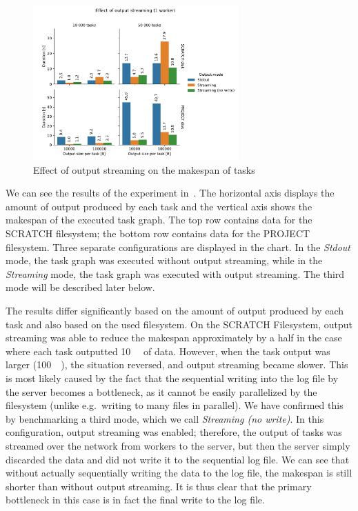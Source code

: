 \begin{figure}[h]
	\centering
	\includegraphics[width=0.7\textwidth]{imgs/hq/charts/io-streaming}
	\caption{Effect of output streaming on the makespan of tasks}
	\label{fig:hq-io-streaming}
\end{figure}

We can see the results of the experiment in~. The horizontal axis displays
the amount of output produced by each task and the vertical axis shows the makespan of the executed
task graph. The top row contains data for the SCRATCH filesystem; the bottom row contains data for
the PROJECT filesystem. Three separate configurations are displayed in the chart. In the
\emph{Stdout} mode, the task graph was executed without output streaming, while in the
\emph{Streaming} mode, the task graph was executed with output streaming. The third mode
will be described later below.

The results differ significantly based on the amount of output produced by each task and also based
on the used filesystem. On the SCRATCH Filesystem, output streaming was able to reduce the makespan
approximately by a half in the case where each task outputted \SI{10}{\kibi\byte} of data.
However, when the task output was larger (\SI{100}{\kibi\byte}), the situation reversed, and
output streaming became slower. This is most likely caused by the fact that the sequential writing
into the log file by the server becomes a bottleneck, as it cannot be easily parallelized by the
filesystem (unlike e.g.\ writing to many files in parallel). We have confirmed this by benchmarking
a third mode, which we call \emph{Streaming (no write)}. In this configuration, output streaming was
enabled; therefore, the output of tasks was streamed over the network from workers to the server,
but then the server simply discarded the data and did not write it to the sequential log file. We
can see that without actually sequentially writing the data to the log file, the makespan is still
shorter than without output streaming. It is thus clear that the primary bottleneck in this case is
in fact the final write to the log file.

